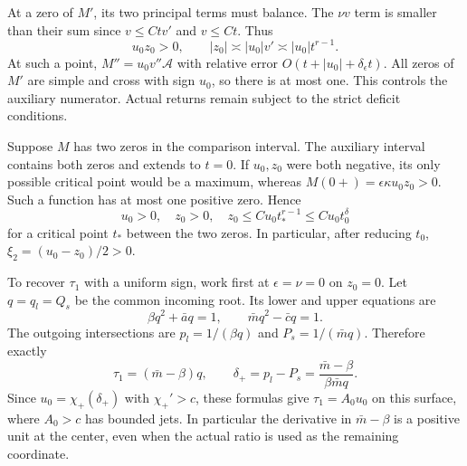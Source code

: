 At a zero of $M'$, its two principal terms must balance. The
$\nu v$ term is smaller than their sum since
$v\le Ctv'$ and $v\le Ct$. Thus
\begin{equation}\label{rw:finite:three-away-balance}
 u_0z_0>0,\qquad |z_0|\asymp|u_0|v'
                      \asymp |u_0|t^{r-1}.
\end{equation}
At such a point,
$M''=u_0v''\mathcal A$ with relative error
$O(t+|u_0|+\delta_\epsilon t)$.
All zeros of $M'$ are simple and cross with sign $u_0$, so there
is at most one. This controls the auxiliary numerator. Actual returns
remain subject to the strict deficit conditions.

Suppose $M$ has two zeros in the comparison interval. The auxiliary
interval contains both zeros and extends to $t=0$. If $u_0,z_0$
were both negative, its only possible critical point would be a maximum, whereas
$M(0+)=\epsilon\kappa u_0z_0>0$. Such a function has at most one
positive zero. Hence
\begin{equation}\label{rw:finite:three-away-positive}
 u_0>0,\quad z_0>0,\quad
 z_0\le Cu_0t_*^{r-1}\le Cu_0t_0^\delta
\end{equation}
for a critical point $t_*$ between the two zeros. In particular,
after reducing $t_0$, $\xi_2=(u_0-z_0)/2>0$.

To recover $\tau_1$ with a uniform sign, work first at
$\epsilon=\nu=0$ on $z_0=0$. Let $q=q_l=Q_s$ be the common
incoming root. Its lower and upper equations are
\[
 \beta q^2+\bar a q=1,\qquad
 \bar m q^2-\bar c q=1.
\]
The outgoing intersections are $p_l=1/(\beta q)$ and
$P_s=1/(\bar m q)$. Therefore exactly
\begin{equation}\label{rw:finite:three-away-transverse}
 \tau_1=(\bar m-\beta)q,\qquad
 \delta_+=p_l-P_s=\frac{\bar m-\beta}{\beta\bar m q}.
\end{equation}
Since $u_0=\chi_+(\delta_+)$ with $\chi_+'>c$, these formulas
give $\tau_1=A_0u_0$ on this surface, where $A_0>c$ has bounded
jets. In particular the derivative in $\bar m-\beta$ is a
positive unit at the center, even when the actual ratio is used
as the remaining coordinate.

